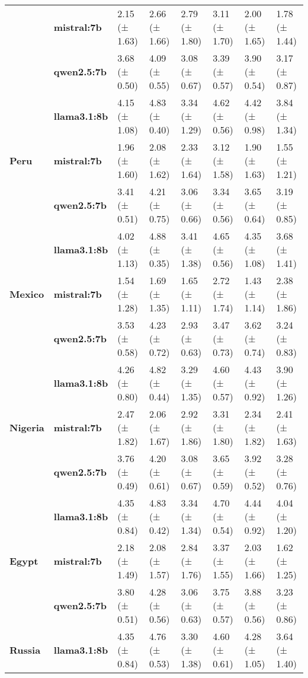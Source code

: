 \begin{tabular}{llllllll}
\textbf{} & \textbf{mistral:7b} & 2.15 (± 1.63) & 2.66 (± 1.66) & 2.79 (± 1.80) & 3.11 (± 1.70) & 2.00 (± 1.65) & 1.78 (± 1.44) \\
\textbf{} & \textbf{qwen2.5:7b} & 3.68 (± 0.50) & 4.09 (± 0.55) & 3.08 (± 0.67) & 3.39 (± 0.57) & 3.90 (± 0.54) & 3.17 (± 0.87) \\
\cline{1-8}
\multirow[t]{3}{*}{\textbf{Peru}} & \textbf{llama3.1:8b} & 4.15 (± 1.08) & 4.83 (± 0.40) & 3.34 (± 1.29) & 4.62 (± 0.56) & 4.42 (± 0.98) & 3.84 (± 1.34) \\
\textbf{} & \textbf{mistral:7b} & 1.96 (± 1.60) & 2.08 (± 1.62) & 2.33 (± 1.64) & 3.12 (± 1.58) & 1.90 (± 1.63) & 1.55 (± 1.21) \\
\textbf{} & \textbf{qwen2.5:7b} & 3.41 (± 0.51) & 4.21 (± 0.75) & 3.06 (± 0.66) & 3.34 (± 0.56) & 3.65 (± 0.64) & 3.19 (± 0.85) \\
\cline{1-8}
\multirow[t]{3}{*}{\textbf{Mexico}} & \textbf{llama3.1:8b} & 4.02 (± 1.13) & 4.88 (± 0.35) & 3.41 (± 1.38) & 4.65 (± 0.56) & 4.35 (± 1.08) & 3.68 (± 1.41) \\
\textbf{} & \textbf{mistral:7b} & 1.54 (± 1.28) & 1.69 (± 1.35) & 1.65 (± 1.11) & 2.72 (± 1.74) & 1.43 (± 1.14) & 2.38 (± 1.86) \\
\textbf{} & \textbf{qwen2.5:7b} & 3.53 (± 0.58) & 4.23 (± 0.72) & 2.93 (± 0.63) & 3.47 (± 0.73) & 3.62 (± 0.74) & 3.24 (± 0.83) \\
\cline{1-8}
\multirow[t]{3}{*}{\textbf{Nigeria}} & \textbf{llama3.1:8b} & 4.26 (± 0.80) & 4.82 (± 0.44) & 3.29 (± 1.35) & 4.60 (± 0.57) & 4.43 (± 0.92) & 3.90 (± 1.26) \\
\textbf{} & \textbf{mistral:7b} & 2.47 (± 1.82) & 2.06 (± 1.67) & 2.92 (± 1.86) & 3.31 (± 1.80) & 2.34 (± 1.82) & 2.41 (± 1.63) \\
\textbf{} & \textbf{qwen2.5:7b} & 3.76 (± 0.49) & 4.20 (± 0.61) & 3.08 (± 0.67) & 3.65 (± 0.59) & 3.92 (± 0.52) & 3.28 (± 0.76) \\
\cline{1-8}
\multirow[t]{3}{*}{\textbf{Egypt}} & \textbf{llama3.1:8b} & 4.35 (± 0.84) & 4.83 (± 0.42) & 3.34 (± 1.34) & 4.70 (± 0.54) & 4.44 (± 0.92) & 4.04 (± 1.20) \\
\textbf{} & \textbf{mistral:7b} & 2.18 (± 1.49) & 2.08 (± 1.57) & 2.84 (± 1.76) & 3.37 (± 1.55) & 2.03 (± 1.66) & 1.62 (± 1.25) \\
\textbf{} & \textbf{qwen2.5:7b} & 3.80 (± 0.51) & 4.28 (± 0.56) & 3.06 (± 0.63) & 3.75 (± 0.57) & 3.88 (± 0.56) & 3.23 (± 0.86) \\
\cline{1-8}
\multirow[t]{3}{*}{\textbf{Russia}} & \textbf{llama3.1:8b} & 4.35 (± 0.84) & 4.76 (± 0.53) & 3.30 (± 1.38) & 4.60 (± 0.61) & 4.28 (± 1.05) & 3.64 (± 1.40) \\

\end{tabular}
